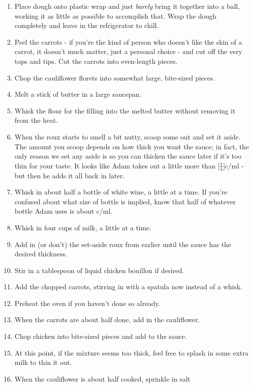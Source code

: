 \documentclass{book}
\begin{document}
\begin{recipe}
{\begin{enumerate}
			\item Place dough onto plastic wrap and just \emph{barely} bring it
				together into a ball, working it as little as possible to
				accomplish that. Wrap the dough completely and leave in the
				refrigerator to chill.
			\item Peel the carrots - if you're the kind of person who doesn't
				like the skin of a carrot, it doesn't much matter, just a
				personal choice - and cut off the very tops and tips. Cut the
				carrots into even-length pieces.
			\item Chop the cauliflower florets into somewhat large, bite-sized
				pieces.
			\item Melt a stick of butter in a large saucepan.
			\item Whisk the flour for the filling into the melted butter without
				removing it from the heat.
			\item When the roux starts to smell a bit nutty, scoop some out and
				set it aside. The amount you scoop depends on how thick you want
				the sauce; in fact, the only reason we set any aside is so you
				can thicken the sauce later if it's too thin for your taste. It
				looks like Adam takes out a little more than
				\unit[$\frac{1}{4}$]{c}/\unit[50]{ml} - but then he adds it all
				back in later.
			\item Whisk in about half a bottle of white wine, a little at a
				time. If you're confused about what size of bottle is implied,
				know that half of whatever bottle Adam uses is about
				\unit[2]{c}/\unit[500]{ml}.
			\item Whisk in four cups of milk, a little at a time.
			\item Add in (or don't) the set-aside roux from earlier until the
				sauce has the desired thickness.
			\item Stir in a tablespoon of liquid chicken bouillon if desired.
			\item Add the chopped carrots, stirring in with a spatula now
				instead of a whisk.
			\item Preheat the oven if you haven't done so already.
			\item When the carrots are about half done, add in the cauliflower.
			\item Chop chicken into bite-sized pieces and add to the sauce.
			\item At this point, if the mixture seems too thick, feel free to
				splash in some extra milk to thin it out.
			\item When the cauliflower is about half cooked, sprinkle in salt

\end{enumerate}}
\end{recipe}
\end{document}
